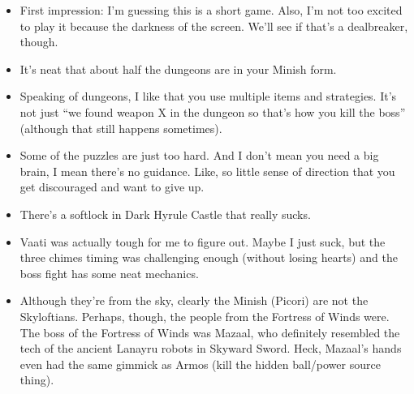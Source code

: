 \newpage

\etocsettocstyle{}{}
\localtableofcontents


\newpage
{}



\newpage
{}



\newpage
{}
\begin{itemize}
	\item{First impression: I'm guessing this is a short game. Also, I'm not too excited to play it because the darkness of the screen. We'll see if that's a dealbreaker, though.}
	\item{It's neat that about half the dungeons are in your Minish form.}
	\item{Speaking of dungeons, I like that you use multiple items and strategies. It's not just ``we found weapon X in the dungeon so that's how you kill the boss'' (although that still happens sometimes).}
	\item{Some of the puzzles are just too hard. And I don't mean you need a big brain, I mean there's no guidance. Like, so little sense of direction that you get discouraged and want to give up.}
	\item{There's a softlock in Dark Hyrule Castle that really sucks.}
	\item{Vaati was actually tough for me to figure out. Maybe I just suck, but the three chimes timing was challenging enough (without losing hearts) and the boss fight has some neat mechanics.}
\end{itemize}


\newpage
{}
\begin{itemize}
	\item{Although they're from the sky, clearly the Minish (Picori) are not the Skyloftians. Perhaps, though, the people from the Fortress of Winds were. The boss of the Fortress of Winds was Mazaal, who definitely resembled the tech of the ancient Lanayru robots in Skyward Sword.
	Heck, Mazaal's hands even had the same gimmick as Armos (kill the hidden ball/power source thing).
	}
\end{itemize}



